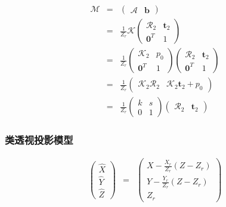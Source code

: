 \documentclass{beamer}
\newcommand{\tmmathbf}[1]{\ensuremath{\boldsymbol{#1}}}
\begin{document}
{{\begin{frame}
  \begin{eqnarray*}
    \mathcal{M} & = & \left(\begin{array}{cc}
      \mathcal{A} & \tmmathbf{b}
    \end{array}\right)\\
    & = & \frac{1}{Z_r} \mathcal{K} \left(\begin{array}{cc}
      \mathcal{R}_2 & \tmmathbf{t}_2\\
      \tmmathbf{0}^T & 1
    \end{array}\right)\\
    & = & \frac{1}{Z_r} \left(\begin{array}{cc}
      \mathcal{K}_2 & p_0\\
      \tmmathbf{0}^T & 1
    \end{array}\right) \left(\begin{array}{cc}
      \mathcal{R}_2 & \tmmathbf{t}_2\\
      \tmmathbf{0}^T & 1
    \end{array}\right)\\
    & = & \frac{1}{Z_r} \left(\begin{array}{cc}
      \mathcal{K}_2 \mathcal{R}_2 & \mathcal{K}_2 \tmmathbf{t}_2 + p_0
    \end{array}\right)\\
    & = & \frac{1}{Z_r} \left(\begin{array}{cc}
      k & s\\
      0 & 1
    \end{array}\right) \left(\begin{array}{cc}
      \mathcal{R}_2 & \tmmathbf{t}_2
    \end{array}\right)
  \end{eqnarray*}
\end{frame}}{\begin{frame}
  \frametitle{类透视投影模型}
  \begin{eqnarray*}
    \left(\begin{array}{c}
      \hat{X}\\
      \hat{Y}\\
      \hat{Z}
    \end{array}\right) & = & \left(\begin{array}{c}
      X - \frac{X_r}{Z_r} (Z - Z_r)\\
      Y - \frac{Y_r}{Z_r} (Z - Z_r)\\
      Z_r
    \end{array}\right)\\

\end{eqnarray*}
\end{frame}}}
\end{document}
